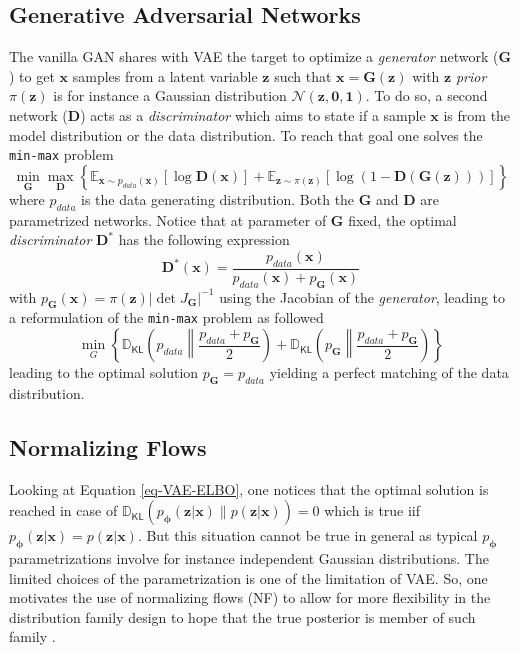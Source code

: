 \documentclass[11pt]{amsart}
\newcommand{\Esp}[0]{\ensuremath{\mathbb{E}}}
\newcommand{\DKL}[0]{\ensuremath{\mathbb{D}_{\mathsf{KL}}}}
\begin{document}
\subsection{Generative Adversarial Networks}
%
The vanilla GAN \citep{goodfellow2014generative} shares with VAE the target to optimize a \textit{generator} network ($\bm{G}$) to get $\bm{x}$ samples from a latent variable $\bm{z}$ such that  $\bm{x} = \bm{G}(\bm{z})$ with $\bm{z}$ \textit{prior} $\pi(\bm{z})$ is for instance a Gaussian distribution $\mathcal{N}(\bm{z},\bm{0},\bm{1})$. To do so, a second network ($\bm{D}$) acts as a \textit{discriminator} which aims to state if a sample $\bm{x}$ is from the model distribution or the data distribution. To reach that goal one solves the \texttt{min-max} problem
\begin{equation}
\min_{\bm{G}} \max_{\bm{D}}\left\{ \Esp_{\bm{x}\sim p_{data}(\bm{x})}[\log \bm{D}(\bm{x})] + \Esp_{\bm{z}\sim \pi(\bm{z})}[\log(1-\bm{D}(\bm{G}(\bm{z})))] \right\}
\end{equation} 
where $p_{data}$ is the data generating distribution. Both the  $\bm{G}$ and $\bm{D}$ are parametrized networks. Notice that at parameter of $\bm{G}$ fixed, the optimal \textit{discriminator} $\bm{D}^\ast$ has the following expression
\begin{equation}
\bm{D}^\ast(\bm{x}) = \frac{p_{data}(\bm{x})}{p_{data}(\bm{x}) + p_{\bm{G}}(\bm{x})}
\end{equation}
with $p_{\bm{G}}(\bm{x}) = \pi(\bm{z})|\det J_{\bm{G}} |^{-1}$ using the Jacobian of the \textit{generator}, leading to a reformulation of the \texttt{min-max} problem as followed
\begin{equation}
\min_G \left\{ \DKL{\left( p_{data} \left\| \frac{p_{data} + p_{\bm{G}}}{2}\right. \right) }  + \DKL{\left(p_{\bm{G}} \left\| \frac{p_{data} + p_{\bm{G}}}{2} \right. \right)} \right\}
\end{equation}
leading to the optimal solution $p_{\bm{G}} = p_{data}$ yielding a perfect matching of the data distribution. 
%
\subsection{Normalizing Flows}
%
Looking at Equation \ref{eq-VAE-ELBO}, one notices that the optimal solution is reached in case of $\DKL(p_{\bm{\phi}}(\bm{z}|\bm{x})\| p(\bm{z}|\bm{x}))=0$ which is true iif $p_{\bm{\phi}}(\bm{z}|\bm{x}) = p(\bm{z}|\bm{x})$. But this situation cannot be true in general as typical $p_{\bm{\phi}}$ parametrizations involve for instance independent Gaussian distributions. The limited choices of the parametrization is one of the limitation of VAE. So, one motivates the use of normalizing flows (NF) to allow for more flexibility in the distribution family design to hope that the true posterior is member of such family \citep{Tabak2010, Tabak2013a, Rezende2015}. 
\end{document}
